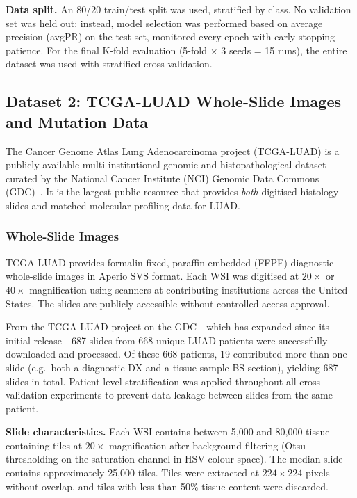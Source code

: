 \textbf{Data split.}
An 80/20 train/test split was used, stratified by class.
No validation set was held out; instead, model selection was performed
based on average precision (avgPR) on the test set, monitored every
epoch with early stopping patience.
For the final K-fold evaluation (5-fold $\times$ 3 seeds = 15 runs),
the entire dataset was used with stratified cross-validation.


\subsection{Dataset 2: TCGA-LUAD Whole-Slide Images and Mutation Data}
\label{sec:uc:tcga}

The Cancer Genome Atlas Lung Adenocarcinoma project (TCGA-LUAD) is a
publicly available multi-institutional genomic and histopathological
dataset curated by the National Cancer Institute (NCI) Genomic Data
Commons (GDC)~\cite{tcga2014luad}.
It is the largest public resource that provides \emph{both} digitised
histology slides and matched molecular profiling data for LUAD.

\subsubsection{Whole-Slide Images}

TCGA-LUAD provides formalin-fixed, paraffin-embedded (FFPE) diagnostic
whole-slide images in Aperio SVS format.
Each WSI was digitised at $20\times$ or $40\times$ magnification using
scanners at contributing institutions across the United States.
The slides are publicly accessible without controlled-access approval.

From the TCGA-LUAD project on the GDC---which has expanded since its
initial release---687 slides from 668 unique LUAD patients were
successfully downloaded and processed.
Of these 668 patients, 19 contributed more than one slide (e.g.\ both a
diagnostic DX and a tissue-sample BS section), yielding 687 slides in
total.
Patient-level stratification was applied throughout all cross-validation
experiments to prevent data leakage between slides from the same patient.

\textbf{Slide characteristics.}
Each WSI contains between 5,000 and 80,000 tissue-containing tiles at
$20\times$ magnification after background filtering (Otsu thresholding
on the saturation channel in HSV colour space).
The median slide contains approximately 25,000 tiles.
Tiles were extracted at $224 \times 224$ pixels without overlap, and
tiles with less than 50\% tissue content were discarded.


